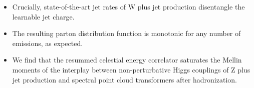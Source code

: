 \begin{itemize}
  \item Crucially, state-of-the-art jet rates of W plus jet production disentangle the learnable jet charge.
  \item The resulting parton distribution function is monotonic for any number of emissions, as expected.
  \item We find that the resummed celestial energy correlator saturates the Mellin moments of the interplay between non-perturbative Higgs couplings of Z plus jet production and spectral point cloud transformers after hadronization.
\end{itemize}

